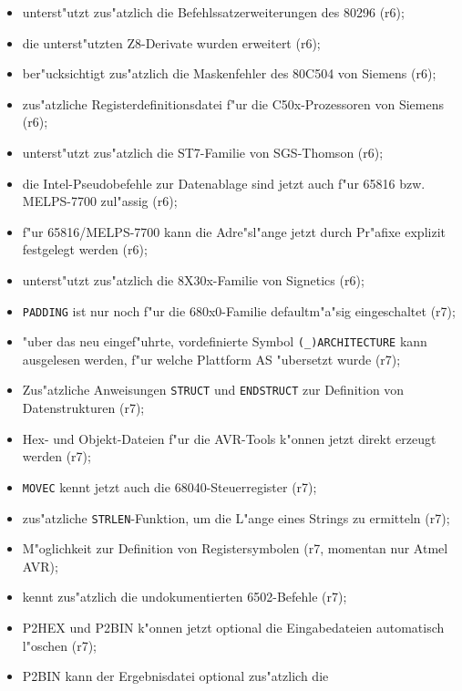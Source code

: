 \documentclass[12pt,a4paper,twoside]{report}
\newcommand{\tty}[1]{{\tt #1}}
\newcommand{\asname}{AS}
\newcommand{\predefsym}[1]{{\tt (\_)#1}}
\begin{document}
\begin{itemize}
{\begin{itemize}
{            Instruments (r6);}
      \item{unterst"utzt zus"atzlich die Befehlssatzerweiterungen
            des 80296 (r6);}
      \item{die unterst"utzten Z8-Derivate wurden erweitert
            (r6);}
      \item{ber"ucksichtigt zus"atzlich die Maskenfehler des 80C504
            von Siemens (r6);}
      \item{zus"atzliche Registerdefinitionsdatei f"ur die C50x-Prozessoren
            von Siemens (r6);}
      \item{unterst"utzt zus"atzlich die ST7-Familie von SGS-Thomson (r6);}
      \item{die Intel-Pseudobefehle zur Datenablage sind jetzt
            auch f"ur 65816 bzw. MELPS-7700 zul"assig (r6);}
      \item{f"ur 65816/MELPS-7700 kann die Adre"sl"ange jetzt durch
            Pr"afixe explizit festgelegt werden (r6);}
      \item{unterst"utzt zus"atzlich die 8X30x-Familie von Signetics
            (r6);}
      \item{\tty{PADDING} ist nur noch f"ur die 680x0-Familie defaultm"a"sig
            eingeschaltet (r7);}
      \item{"uber das neu eingef"uhrte, vordefinierte Symbol
            \predefsym{ARCHITECTURE} kann ausgelesen werden, f"ur welche
            Plattform \asname{} "ubersetzt wurde (r7);}
      \item{Zus"atzliche Anweisungen \tty{STRUCT} und \tty{ENDSTRUCT} zur
            Definition von Datenstrukturen (r7);}
      \item{Hex- und Objekt-Dateien f"ur die AVR-Tools k"onnen jetzt
            direkt erzeugt werden (r7);}
      \item{\tty{MOVEC} kennt jetzt auch die 68040-Steuerregister (r7);}
      \item{zus"atzliche \tty{STRLEN}-Funktion, um die L"ange eines
            Strings zu ermitteln (r7);}
      \item{M"oglichkeit zur Definition von Registersymbolen (r7, momentan
            nur Atmel AVR);}
      \item{kennt zus"atzlich die undokumentierten 6502-Befehle (r7);}
      \item{P2HEX und P2BIN k"onnen jetzt optional die Eingabedateien
            automatisch l"oschen (r7);}
      \item{P2BIN kann der Ergebnisdatei optional zus"atzlich die
}
\end{itemize}}
\end{itemize}
\end{document}
